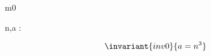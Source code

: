 \documentclass[12pt]{amsart}
\title{}
\author{}
\date{} %
\begin{document}
\maketitle
\tableofcontents


\begin{machine}{m0}

	\begin{variable}
		n,a : \Int
	\end{variable}



\begin{align*}
\invariant{inv0}
{	a = n^3	}
\end{align*}
%



\end{machine}
\end{document}
